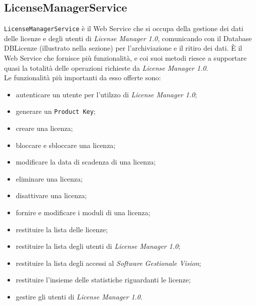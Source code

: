 \subsection{LicenseManagerService}
\texttt{LicenseManagerService} è il Web Service che si occupa della gestione dei dati delle licenze e degli utenti di \textit{License Manager 1.0}, comunicando con il Database DBLicenze (illustrato nella sezione) per l'archiviazione e il ritiro dei dati. È il Web Service che fornisce più funzionalità, e coi suoi metodi riesce a supportare quasi la totalità delle operazioni richieste da \textit{License Manager 1.0}.\\
Le funzionalità più importanti da esso offerte sono:

\begin{itemize}
\item autenticare un utente per l'utilzzo di \textit{License Manager 1.0};
\item generare un \texttt{Product Key};
\item creare una licenza;
\item bloccare e sbloccare una licenza;
\item modificare la data di scadenza di una licenza;
\item eliminare una licenza;
\item disattivare una licenza;
\item fornire e modificare i moduli di una licenza;
\item restituire la lista delle licenze;
\item restituire la lista degli utenti di \textit{License Manager 1.0};
\item restituire la lista degli accessi al \textit{Software Gestionale Vision};
\item restituire l'insieme delle statistiche riguardanti le licenze;
\item gestire gli utenti di \textit{License Manager 1.0}.

\end{itemize}
 


